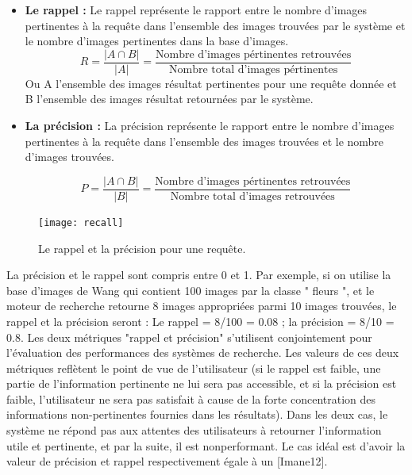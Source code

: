 \begin{itemize}
	\item \textbf{Le rappel :}
	Le rappel représente le rapport entre le nombre d’images pertinentes à la requête dans l’ensemble des images trouvées par le système et le nombre d’images pertinentes dans la base d’images.
	\begin{equation}
		R = \frac{| A \cap B|}{| A |} = \frac{\text{Nombre d'images pértinentes retrouvées}}{\text{Nombre total d'images pértinentes}}
	\end{equation}
	Ou A l’ensemble des images résultat pertinentes pour une requête donnée et B l’ensemble des images résultat retournées par le système.
	
	\item \textbf{La précision :}
	La précision représente le rapport entre le nombre d’images pertinentes à la requête dans l’ensemble des images trouvées et le nombre d’images trouvées.
	
	\begin{equation}
	P = \frac{| A \cap B|}{| B |} = \frac{\text{Nombre d'images pértinentes retrouvées}}{\text{Nombre total d'images retrouvées}}
	\end{equation}
\end{itemize}

\begin{figure}[H]
	\centering
	\texttt{[image: recall]} 
	\caption{ Le rappel et la précision pour une requête.}
\end{figure}

La précision et le rappel sont compris entre 0 et 1. Par exemple, si on utilise la base d’images de Wang qui contient 100 images par la classe " fleurs ", et le moteur de recherche retourne 8 images appropriées parmi 10 images trouvées, le rappel et la précision seront :
Le rappel = 8/100 = 0.08 ; la précision = 8/10 = 0.8.
Les deux métriques "rappel et précision" s’utilisent conjointement pour
l’évaluation des performances des systèmes de recherche. Les valeurs de ces deux métriques reflètent le point de vue de l’utilisateur (si le rappel est faible, une partie de l’information pertinente ne lui sera pas accessible, et si la précision est faible, l’utilisateur ne sera pas satisfait à cause de la forte concentration des informations non-pertinentes fournies dans les résultats).
Dans les deux cas, le système ne répond pas aux attentes des utilisateurs à retourner l’information utile et pertinente, et par la suite, il est nonperformant. Le cas idéal est d’avoir la valeur de précision et rappel
respectivement égale à un [Imane12].

